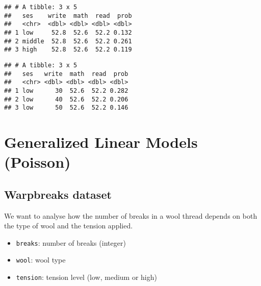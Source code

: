 \documentclass[
  oneside]{book}
\newenvironment{Shaded}{\begin{snugshade}}{\end{snugshade}}
\newcommand{\AttributeTok}[1]{\textcolor[rgb]{0.77,0.63,0.00}{#1}}
\newcommand{\DecValTok}[1]{\textcolor[rgb]{0.00,0.00,0.81}{#1}}
\newcommand{\FunctionTok}[1]{\textcolor[rgb]{0.00,0.00,0.00}{#1}}
\newcommand{\NormalTok}[1]{#1}
\newcommand{\OtherTok}[1]{\textcolor[rgb]{0.56,0.35,0.01}{#1}}
\newcommand{\SpecialCharTok}[1]{\textcolor[rgb]{0.00,0.00,0.00}{#1}}
\newcommand{\StringTok}[1]{\textcolor[rgb]{0.31,0.60,0.02}{#1}}
\providecommand{\tightlist}{%
  \setlength{\itemsep}{0pt}\setlength{\parskip}{0pt}}
\begin{document}
\begin{verbatim}
## # A tibble: 3 x 5
##   ses    write  math  read  prob
##   <chr>  <dbl> <dbl> <dbl> <dbl>
## 1 low     52.8  52.6  52.2 0.132
## 2 middle  52.8  52.6  52.2 0.261
## 3 high    52.8  52.6  52.2 0.119
\end{verbatim}

\begin{Shaded}
\end{Shaded}

\begin{verbatim}
## # A tibble: 3 x 5
##   ses   write  math  read  prob
##   <chr> <dbl> <dbl> <dbl> <dbl>
## 1 low      30  52.6  52.2 0.282
## 2 low      40  52.6  52.2 0.206
## 3 low      50  52.6  52.2 0.146
\end{verbatim}

\hypertarget{generalized-linear-models-poisson}{%
\chapter{Generalized Linear Models (Poisson)}\label{generalized-linear-models-poisson}}

\hypertarget{warpbreaks-dataset}{%
\section{Warpbreaks dataset}\label{warpbreaks-dataset}}

We want to analyse how the number of breaks in a wool thread
depends on both the type of wool and the tension applied.

\begin{itemize}
\tightlist
\item
  \texttt{breaks}: number of breaks (integer)
\item
  \texttt{wool}: wool type
\item
  \texttt{tension}: tension level (low, medium or high)
\end{itemize}
\end{document}
